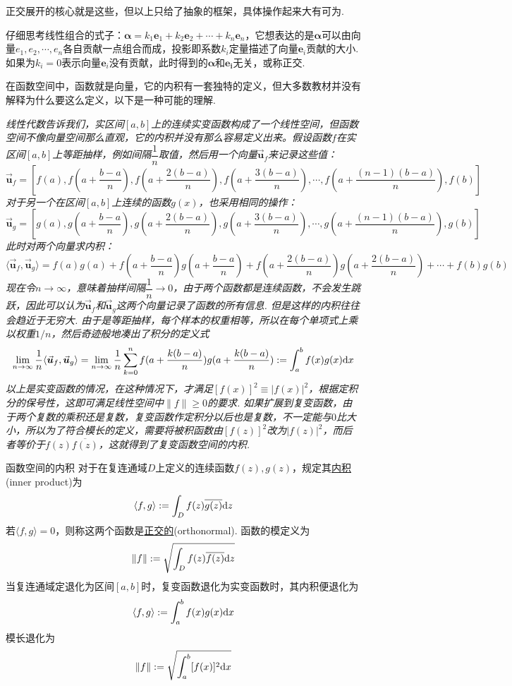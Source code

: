 \documentclass[main.tex]{subfiles}
\begin{document}
正交展开的核心就是这些，但以上只给了抽象的框架，具体操作起来大有可为. 

仔细思考线性组合的式子：\(\bm{\alpha} = k_1\bm{e}_1+k_2\bm{e}_2+\cdots+k_n\bm{e}_n\)，它想表达的是\(\bm{\alpha}\)可以由向量\(e_1, e_2, \cdots, e_n\)各自贡献一点组合而成，投影即系数\(k_i\)定量描述了向量\(\bm{e}_i\)贡献的大小. 如果为\(k_i=0\)表示向量\(\bm{e}_i\)没有贡献，此时得到的\(\bm{\alpha}\)和\(\bm{e_i}\)无关，或称正交.

在函数空间中，函数就是向量，它的内积有一套独特的定义，但大多数教材并没有解释为什么要这么定义，以下是一种可能的理解.

\textit{
线性代数告诉我们，实区间\([a,b]\)上的连续实变函数构成了一个线性空间，但函数空间不像向量空间那么直观，它的内积并没有那么容易定义出来。假设函数\(f\)在实区间\([a,b]\)上等距抽样，例如间隔\(\dfrac{1}{n}\)取值，然后用一个向量\(\vec{\bm{u}}_f\)来记录这些值：
\[\vec{\bm{u}}_f = \left[f(a), f(a+\frac{b-a}{n}), f(a+\frac{2(b-a)}{n}), f(a+\frac{3(b-a)}{n}), \cdots, f(a+\frac{(n-1)(b-a)}{n}), f(b)\right]\]
对于另一个在区间\([a,b]\)上连续的函数\(g(x)\)，也采用相同的操作：
\[\vec{\bm{u}}_g = \left[g(a), g(a+\frac{b-a}{n}), g(a+\frac{2(b-a)}{n}), g(a+\frac{3(b-a)}{n}), \cdots, g(a+\frac{(n-1)(b-a)}{n}), g(b)\right]\]
此时对两个向量求内积：
\[\langle\vec{\bm{u}}_f,\vec{\bm{u}}_g\rangle = f(a)g(a)+f(a+\frac{b-a}{n})g(a+\frac{b-a}{n})+f(a+\frac{2(b-a)}{n})g(a+\frac{2(b-a)}{n})+\cdots+f(b)g(b)\]
现在令\(n \to \infty\)，意味着抽样间隔\(\dfrac{1}{n} \to 0\)，由于两个函数都是连续函数，不会发生跳跃，因此可以认为\(\vec{\bm{u}}_f\)和\(\vec{\bm{u}}_g\)这两个向量记录了函数的所有信息. 但是这样的内积往往会趋近于无穷大. 由于是等距抽样，每个样本的权重相等，所以在每个单项式上乘以权重\(1/n\)，然后奇迹般地凑出了积分的定义式
\[\lim_{n \to \infty}\frac{1}{n}\langle\vec{\bm{u}}_f,\vec{\bm{u}}_g\rangle = \lim_{n \to \infty}\frac{1}{n}\sum_{k=0}^{n}f(a+\frac{k(b-a)}{n})g(a+\frac{k(b-a)}{n}) := \int_{a}^{b} f(x)g(x){\rm d}x\]
以上是实变函数的情况，在这种情况下，才满足\([f(x)]^2\equiv|f(x)|^2\)，根据定积分的保号性，这即可满足线性空间中\(\|f\|\geq 0\)的要求. 如果扩展到复变函数，由于两个复数的乘积还是复数，复变函数作定积分以后也是复数，不一定能与\(0\)比大小，所以为了符合模长的定义，需要将被积函数由\([f(z)]^2\)改为\(|f(z)|^2\)，而后者等价于\(f(z)\overline{f(z)}\)，这就得到了复变函数空间的内积.
}
\begin{definition}{函数空间的内积}
    对于在复连通域\(D\)上定义的连续函数\(f(z),g(z)\)，规定其\uline{内积}(inner product)为
    \[ \langle f,g \rangle := \int_{D} f(z)\overline{g(z)}{\rm d}z\]
    若\(\langle f,g \rangle=0\)，则称这两个函数是\uline{正交的}(orthonormal). 函数的模定义为
    \[ \|f\| := \sqrt{\int_{D}f(z)\overline{f(z)}{\rm d}z}\]
    当复连通域定退化为区间\([a,b]\)时，复变函数退化为实变函数时，其内积便退化为
    \[ \langle f,g \rangle := \int_{a}^{b} f(x)g(x){\rm d}x\]
    模长退化为
    \[ \|f\| := \sqrt{\int_{a}^{b}[f(x)]^2{\rm d}x}\]
\end{definition}
\end{document}
